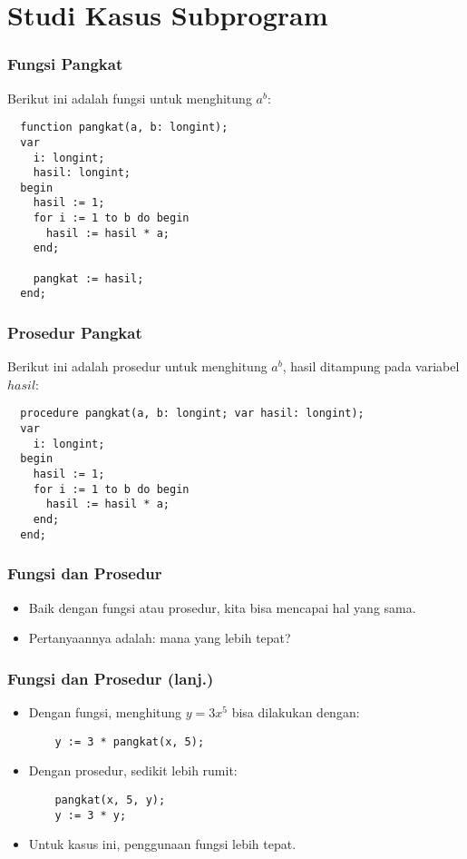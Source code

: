 \section{Studi Kasus Subprogram}
\frame{\sectionpage}

\begin{frame}[fragile]
\frametitle{Fungsi Pangkat}
Berikut ini adalah fungsi untuk menghitung $a^b$:
\begin{lstlisting}
  function pangkat(a, b: longint);
  var
    i: longint;
    hasil: longint;
  begin
    hasil := 1;
    for i := 1 to b do begin
      hasil := hasil * a;
    end;

    pangkat := hasil;
  end;
\end{lstlisting}
\end{frame}

\begin{frame}[fragile]
\frametitle{Prosedur Pangkat}
Berikut ini adalah prosedur untuk menghitung $a^b$, hasil ditampung pada variabel $hasil$:
\begin{lstlisting}
  procedure pangkat(a, b: longint; var hasil: longint);
  var
    i: longint;
  begin
    hasil := 1;
    for i := 1 to b do begin
      hasil := hasil * a;
    end;
  end;
\end{lstlisting}
\end{frame}

\begin{frame}[fragile]
\frametitle{Fungsi dan Prosedur}
\begin{itemize}
  \item Baik dengan fungsi atau prosedur, kita bisa mencapai hal yang sama.
  \item Pertanyaannya adalah: \alert{mana yang lebih tepat}?
\end{itemize}
\end{frame}

\begin{frame}[fragile]
\frametitle{Fungsi dan Prosedur (lanj.)}
\begin{itemize}
  \item Dengan fungsi, menghitung $y = 3x^5$ bisa dilakukan dengan:
  \begin{lstlisting}
    y := 3 * pangkat(x, 5);
  \end{lstlisting}

  \item Dengan prosedur, sedikit lebih rumit:
  \begin{lstlisting}
    pangkat(x, 5, y);
    y := 3 * y;
  \end{lstlisting}

  \item Untuk kasus ini, \alert{penggunaan fungsi lebih tepat}.
\end{itemize}
\end{frame}

